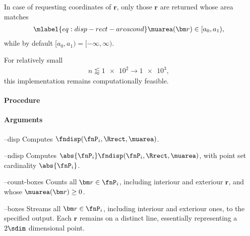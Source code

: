 In case of requesting coordinates of $\bm r$, only those $\bm r$ are returned whose area matches
\begin{align}\mlabel{eq:disp-rect-areacond}
  \muarea(\bm r) \in [a_0, a_1),
\end{align}
while by default $[a_0, a_1) = [-\infty, \infty)$.

For relatively small 
\begin{align*}
  n \lessapprox \num{1e2} \rightarrow \num{1e3},
\end{align*}
this implementation remains computationally feasible.

\paragraph{Procedure}

\begin{synopsis}
\end{synopsis}

\paragraph{Arguments}

\procarginseq{\ptseqsize}

\procargout

\begin{procarg}{--disp}
  Computes $\fndisp(\fnP_i, \Rrect, \muarea)$.
\end{procarg}

\begin{procarg}{--ndisp}
  Computes $\abs{\fnP_i} \fndisp(\fnP_i, \Rrect, \muarea)$, with point set cardinality $\abs{\fnP_i}$.
\end{procarg}

\begin{procarg}{--count-boxes}
  Counts all $\bm r \in \fnP_i$, including interiour and exteriour $\bm r$, and whose $\muarea(\bm r) \geq 0$.
\end{procarg}

\begin{procarg}{--boxes}
  Streams all $\bm r \in \fnP_i$, including interiour and exteriour ones, to the specified output. Each $\bm r$ remains on a distinct line, essentially representing a $2\sdim$ dimensional point.
\end{procarg}

